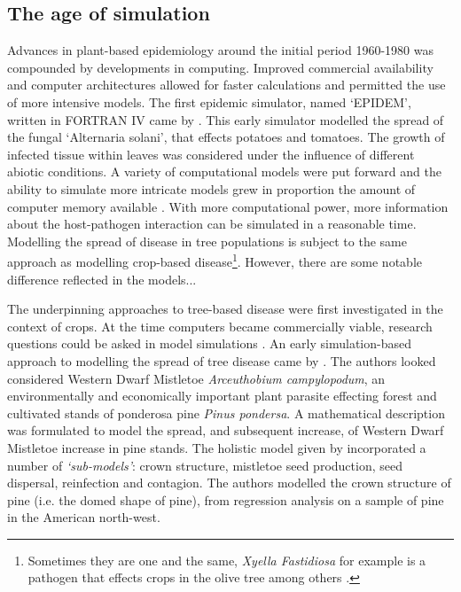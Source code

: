     \subsection{The age of simulation}
    
    Advances in plant-based epidemiology around the initial period 1960-1980 was compounded by developments in computing. Improved commercial availability and computer architectures allowed for faster calculations and permitted the use of more intensive models. The first epidemic simulator, named `EPIDEM', written in FORTRAN IV came by \cite{waggoner1969epidem}. This early simulator modelled the spread of the fungal `Alternaria solani', that effects potatoes and tomatoes. The growth of infected tissue within leaves was considered under the influence of different abiotic conditions. A variety of computational models were put forward \cite{doi:10.1146/annurev.py.23.090185.002031} and the ability to simulate more intricate models grew in proportion the amount of computer memory available \cite{zadoks1972methodology}. With more computational power, more information about the host-pathogen interaction can be simulated in a reasonable time.\\
    
    Modelling the spread of disease in tree populations is subject to the same approach as modelling crop-based disease\footnote{Sometimes they are one and the same, \textit{Xyella Fastidiosa} for example is a pathogen that effects crops in the olive tree \cite{doi:10.1146/annurev-phyto-080417-045849} among others \cite{simpson2000genome}.}. However, there are some notable difference reflected in the models... %
    
    The underpinning approaches to tree-based disease were first investigated in the context of crops. At the time computers became commercially viable, research questions could be asked in model simulations \cite{dixon1979spread}. An early simulation-based approach to modelling the spread of tree disease came by \cite{strand1976simulation}. The authors looked considered Western Dwarf Mistletoe \textit{Arceuthobium campylopodum}, an environmentally and economically important plant parasite effecting forest and cultivated stands of ponderosa pine \textit{Pinus pondersa}. A mathematical description was formulated to model the spread, and subsequent increase, of Western Dwarf Mistletoe increase in pine stands. The holistic model given by \cite{strand1976simulation} incorporated a number of \textit{`sub-models'}: crown structure, mistletoe seed production, seed dispersal, reinfection and contagion. The authors modelled the crown structure of pine (i.e. the domed shape of pine), from regression analysis on a sample of pine in the American north-west.\\
    
